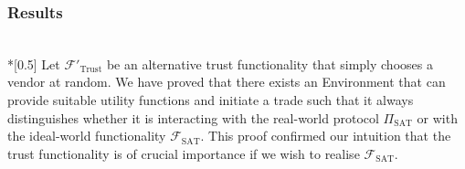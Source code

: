 \subsubsection{Results} \ \\*[0.5\baselineskip]
  Let $\mathcal{F}'_{\mathrm{Trust}}$ be an alternative trust functionality that simply
  chooses a vendor at random. We have proved that there exists an Environment that can
  provide suitable utility functions and initiate a trade such that it always
  distinguishes whether it is interacting with the real-world protocol
  $\Pi_{\mathrm{SAT}}$ or with the ideal-world functionality $\mathcal{F}_{\mathrm{SAT}}$.
  This proof confirmed our intuition that the trust functionality is of crucial importance
  if we wish to realise $\mathcal{F}_{\mathrm{SAT}}$.
